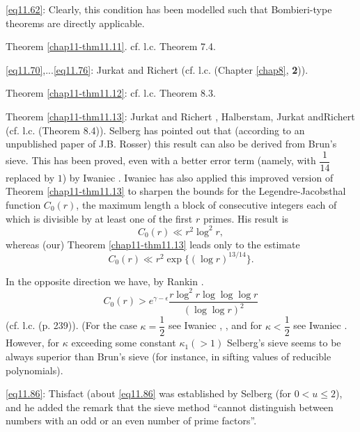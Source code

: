 \eqref{eq11.62}: Clearly, this condition has been modelled  such that
Bombi\-eri-type theorems are directly applicable. 

Theorem \ref{chap11-thm11.11}. cf. l.c. Theorem 7.4.
 
\eqref{eq11.70},...\eqref{eq11.76}: Jurkat and Richert \cite{key1}
(cf. l.c. (Chapter \ref{chap8}, \textbf{2})). 

Theorem \ref{chap11-thm11.12}: cf. l.c.  Theorem 8.3.

Theorem \ref{chap11-thm11.13}: Jurkat and Richert \cite{key1},
Halberstam, Jurkat and\break Richert \cite{key1} (cf. l.c. (Theorem
8.4)). Selberg \cite{key5} has pointed out that
(according to an unpublished paper of J.B. Rosser) this result can
also  be derived from Brun's sieve. This has been proved, even with a
better error term (namely, with $\dfrac{1}{14}$ replaced by $1$) by
Iwaniec \cite{key1}. Iwaniec \cite{key1} has also applied this
improved version of Theorem \ref{chap11-thm11.13} to  sharpen the
bounds for the Legendre-Jacobsthal function $C_0(r)$, the maximum
length a block of consecutive  integers each of which is divisible by
at least one of the first $r$ primes. His result is
$$
C_0 (r)\ll r^2 \log  ^2 r,
$$
whereas (our) Theorem \ref{chap11-thm11.13} leads only to  the estimate
$$
C_0 (r)\ll r^2 \exp \big\{  (\log r) ^{13/14}\big\}.
$$

In the opposite direction we have, by Rankin \cite{key1}. 
$$
C_0(r)>e^{\gamma -\epsilon} \frac{r \log ^2 r \log \log \log r}{(\log \log
  r)^2} 
$$
(cf. l.c. (p. 239)). (For the case $\kappa = \dfrac{1}{2}$ see Iwaniec
\cite{key2}, \cite{key6}, and for $\kappa< \dfrac{1}{2}$ see  Iwaniec
\cite{key7}. However, for $\kappa$  exceeding some constant
$\kappa_1(>1)$ Selberg's sieve seems to be always superior than Brun's
sieve (for instance, in sifting values of reducible polynomials). 

\eqref{eq11.86}: This\pageoriginale fact (about \eqref{eq11.86} was
established by 
Selberg  \cite{key3} (for $0<u \leq 2$), and he added the remark that
the sieve method ``cannot distinguish between numbers with  an odd or
an even  number of prime factors''. 

